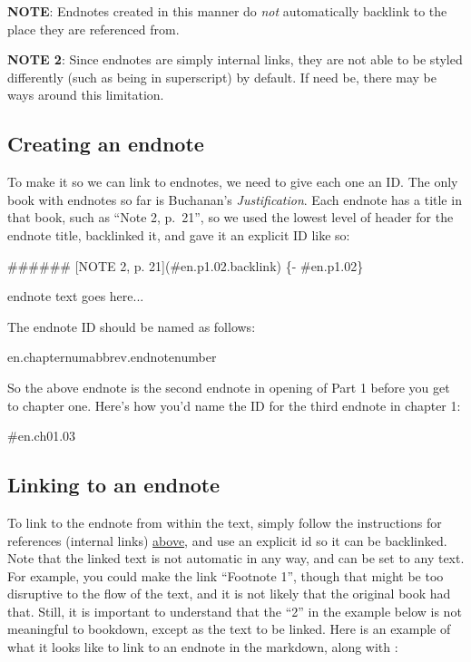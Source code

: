 \documentclass[
  english,
]{book}
\newenvironment{Shaded}{\begin{snugshade}}{\end{snugshade}}
\newcommand{\FunctionTok}[1]{\textcolor[rgb]{0.00,0.00,0.00}{#1}}
\newcommand{\NormalTok}[1]{#1}
\begin{document}
\textbf{NOTE}: Endnotes created in this manner do \emph{not} automatically backlink to the place they are referenced from.

\textbf{NOTE 2}: Since endnotes are simply internal links, they are not able to be styled differently (such as being in superscript) by default. If need be, there may be ways around this limitation.

\hypertarget{creating-an-endnote}{%
\subsection{Creating an endnote}\label{creating-an-endnote}}

To make it so we can link to endnotes, we need to give each one an ID. The only book with endnotes so far is Buchanan's \emph{Justification}. Each endnote has a title in that book, such as ``Note 2, p.~21'', so we used the lowest level of header for the endnote title, backlinked it, and gave it an explicit ID like so:

\begin{Shaded}
\begin{Highlighting}[]
\FunctionTok{\#\#\#\#\#\# [NOTE 2, p. 21](\#en.p1.02.backlink) \{{-} \#en.p1.02\}}

\NormalTok{endnote text goes here...}
\end{Highlighting}
\end{Shaded}

The endnote ID should be named as follows:

en.chapternumabbrev.endnotenumber

So the above endnote is the second endnote in opening of Part 1 before you get to chapter one. Here's how you'd name the ID for the third endnote in chapter 1:

\#en.ch01.03

\hypertarget{linking-to-an-endnote}{%
\subsection{Linking to an endnote}\label{linking-to-an-endnote}}

To link to the endnote from within the text, simply follow the instructions for references (internal links) \protect\hyperlink{references}{above}, and use an explicit id so it can be backlinked. Note that the linked text is not automatic in any way, and can be set to any text. For example, you could make the link ``Footnote 1'', though that might be too disruptive to the flow of the text, and it is not likely that the original book had that. Still, it is important to understand that the ``2'' in the example below is not meaningful to bookdown, except as the text to be linked. Here is an example of what it looks like to link to an endnote in the markdown, along with :
\end{document}
